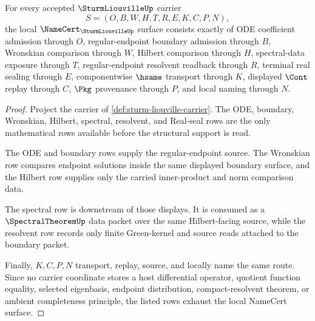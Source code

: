 \begin{theorem}
\label{thm:sturm-liouville-namecert-obligations}
For every accepted $\SturmLiouvilleUp$ carrier
$$
S=(O,B,W,H,T,R,E,K,C,P,N),
$$
the local $\NameCert_{\SturmLiouvilleUp}$ surface consists exactly of ODE coefficient admission through $O$, regular-endpoint boundary admission through $B$, Wronskian comparison through $W$, Hilbert comparison through $H$, spectral-data exposure through $T$, regular-endpoint resolvent readback through $R$, terminal real sealing through $E$, componentwise $\hsame$ transport through $K$, displayed $\Cont$ replay through $C$, $\Pkg$ provenance through $P$, and local naming through $N$.
\end{theorem}
\begin{proof}
Project the carrier of \autoref{def:sturm-liouville-carrier}. The ODE, boundary, Wronskian, Hilbert, spectral, resolvent, and Real-seal rows are the only mathematical rows available before the structural support is read.

The ODE and boundary rows supply the regular-endpoint source. The Wronskian row compares endpoint solutions inside the same displayed boundary surface, and the Hilbert row supplies only the carried inner-product and norm comparison data.

The spectral row is downstream of those displays. It is consumed as a $\SpectralTheoremUp$ data packet over the same Hilbert-facing source, while the resolvent row records only finite Green-kernel and source reads attached to the boundary packet.

Finally, $K,C,P,N$ transport, replay, source, and locally name the same route. Since no carrier coordinate stores a host differential operator, quotient function equality, selected eigenbasis, endpoint distribution, compact-resolvent theorem, or ambient completeness principle, the listed rows exhaust the local NameCert surface.
\end{proof}

